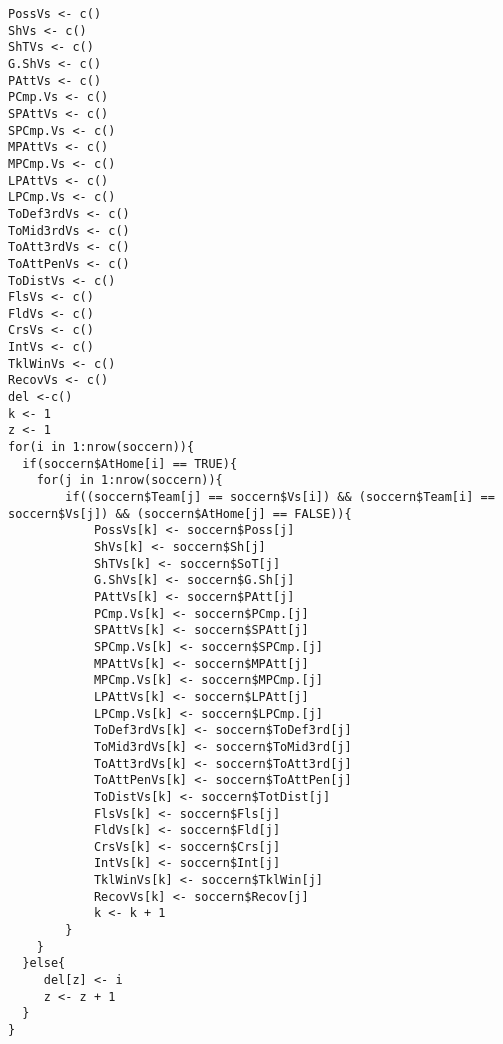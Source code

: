 \begin{lstlisting}
PossVs <- c()
ShVs <- c()
ShTVs <- c()
G.ShVs <- c()
PAttVs <- c()
PCmp.Vs <- c()
SPAttVs <- c()
SPCmp.Vs <- c()
MPAttVs <- c()
MPCmp.Vs <- c()
LPAttVs <- c()
LPCmp.Vs <- c()
ToDef3rdVs <- c()
ToMid3rdVs <- c()
ToAtt3rdVs <- c()
ToAttPenVs <- c()
ToDistVs <- c()
FlsVs <- c()
FldVs <- c()
CrsVs <- c()
IntVs <- c()
TklWinVs <- c()
RecovVs <- c()
del <-c()
k <- 1
z <- 1
for(i in 1:nrow(soccern)){
  if(soccern$AtHome[i] == TRUE){
	for(j in 1:nrow(soccern)){
		if((soccern$Team[j] == soccern$Vs[i]) && (soccern$Team[i] == soccern$Vs[j]) && (soccern$AtHome[j] == FALSE)){
			PossVs[k] <- soccern$Poss[j]
			ShVs[k] <- soccern$Sh[j]
			ShTVs[k] <- soccern$SoT[j]
			G.ShVs[k] <- soccern$G.Sh[j]
			PAttVs[k] <- soccern$PAtt[j]
			PCmp.Vs[k] <- soccern$PCmp.[j]
			SPAttVs[k] <- soccern$SPAtt[j]
			SPCmp.Vs[k] <- soccern$SPCmp.[j]
			MPAttVs[k] <- soccern$MPAtt[j]
			MPCmp.Vs[k] <- soccern$MPCmp.[j]
			LPAttVs[k] <- soccern$LPAtt[j]
			LPCmp.Vs[k] <- soccern$LPCmp.[j]
			ToDef3rdVs[k] <- soccern$ToDef3rd[j]
			ToMid3rdVs[k] <- soccern$ToMid3rd[j]
			ToAtt3rdVs[k] <- soccern$ToAtt3rd[j]
			ToAttPenVs[k] <- soccern$ToAttPen[j]
			ToDistVs[k] <- soccern$TotDist[j]
			FlsVs[k] <- soccern$Fls[j]
			FldVs[k] <- soccern$Fld[j]
			CrsVs[k] <- soccern$Crs[j]
			IntVs[k] <- soccern$Int[j]
			TklWinVs[k] <- soccern$TklWin[j]
			RecovVs[k] <- soccern$Recov[j]
			k <- k + 1
		}      
	}
  }else{
	 del[z] <- i
	 z <- z + 1
  }
}
\end{lstlisting}
\bigskip

